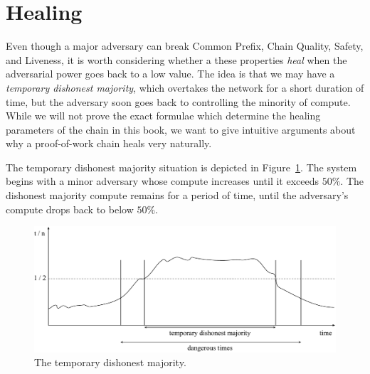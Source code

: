 \section{Healing}

Even though a major adversary can break Common Prefix, Chain Quality, Safety, and Liveness,
it is worth considering whether a these properties \emph{heal} when the adversarial power
goes back to a low value. The idea is that we may have a \emph{temporary dishonest majority},
which overtakes the network for a short duration of time, but the adversary soon goes back
to controlling the minority of compute. While we will not prove the exact formulae which
determine the healing parameters of the chain in this book, we want to give intuitive
arguments about why a proof-of-work chain heals very naturally.

The temporary dishonest majority situation is depicted in Figure~\ref{fig.temporary-dishonest}.
The system begins with a minor adversary whose compute increases until it exceeds
$50\%$. The dishonest majority compute remains for a period of time, until the adversary's
compute drops back to below $50\%$.

\begin{figure}[h]
  \centering
  \includegraphics[width=\columnwidth,keepaspectratio]{figures/temporary-dishonest.pdf}
  \caption{The temporary dishonest majority.}
  \label{fig.temporary-dishonest}
\end{figure}

